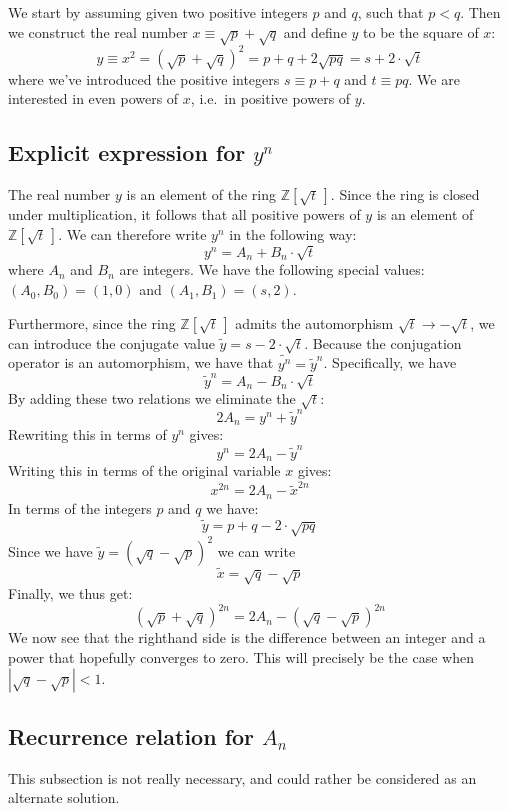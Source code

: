 \documentclass[12pt,oneside,a4paper]{article}
\newcommand{\Z}[1]{{\mathbb{Z}}\!\left[#1\right]}
\begin{document}
We start by assuming given two positive integers $p$ and $q$, such that $p<q$. Then we
construct the real number $x \equiv \sqrt{p} + \sqrt{q}$ and define $y$ to be the square of
$x$:
\[
    y \equiv x^2 = {\left(\sqrt{p} + \sqrt{q}\right)}^2 = p+q + 2\sqrt{pq} = s + 2\cdot\sqrt{t}
\]
where we've introduced the positive integers $s \equiv p+q$ and $t \equiv pq$.  We are
interested in even powers of $x$, i.e.\ in positive powers of $y$.

\subsection{Explicit expression for $y^n$}
The real number $y$ is an element of the ring $\Z{\sqrt{t}\,}$. Since the ring is closed
under multiplication, it follows that all positive powers of $y$ is an element of
$\Z{\sqrt{t}\,}$. We can therefore write $y^n$ in the following way:
\[
    y^n = A_n + B_n\cdot\sqrt{t}
\]
where $A_n$ and $B_n$ are integers.
We have the following special values: $(A_0, B_0) = (1, 0)$ and $(A_1, B_1) = (s, 2)$.

Furthermore, since the ring $\Z{\sqrt{t}\,}$ admits the automorphism $\sqrt{t} \rightarrow
-\sqrt{t}$,
we can introduce the conjugate value $\tilde y = s - 2\cdot\sqrt{t}$. Because the
conjugation operator is an automorphism, we have that $\widetilde{y^n} = {\tilde y}^n$.
Specifically, we have
\[
    {\tilde y}^n = A_n - B_n\cdot\sqrt{t}
\]
By adding these two relations we eliminate the $\sqrt{t}$:
\[
    2A_n = y^n + {\tilde y}^n
\]
Rewriting this in terms of $y^n$ gives:
\[
    y^n =  2A_n - {\tilde y}^n
\]
Writing this in terms of the original variable $x$ gives:
\[
    x^{2n} = 2A_n - {\tilde x}^{2n}
\]
In terms of the integers $p$ and $q$ we have:
\[
    \tilde y = p+q - 2\cdot\sqrt{pq}
\]
Since we have $\tilde y = {\left(\sqrt{q} - \sqrt{p}\right)}^2$ we can write
\[
    \tilde x = \sqrt{q} - \sqrt{p}
\]
Finally, we thus get:
\[
    {\left(\sqrt{p} + \sqrt{q}\right)}^{2n} = 2A_n - {\left(\sqrt{q} - \sqrt{p}\right)}^{2n}
\]
We now see that the righthand side is the difference between an integer and a power that
hopefully converges to zero.  This will precisely be the case when
$\left|\sqrt{q}-\sqrt{p}\right|<1$.


\subsection{Recurrence relation for $A_n$}
This subsection is not really necessary, and could rather be considered as an alternate
solution.
\end{document}
